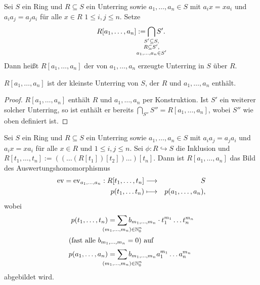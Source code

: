 \documentclass[12pt,a4paper]{scrartcl}
\begin{document}
\begin{defi}
	Sei $S$ ein Ring und $R\subseteq S$ ein Unterring sowie $a_1,\dots,a_n\in S$ mit $a_ix = xa_i$ und $a_ia_j = a_ja_i$ für alle $x\in R$ $1\leq i,j\leq n$. Setze
	\[ R[a_1,\dots,a_n] := \bigcap_{\mathclap{\substack{S'\subseteq S,\\R\subseteq S',\\ a_1,\dots,a_n\in S'}}}S'.\]
	Dann heißt $R[a_1,\dots,a_n]$ der von $a_1,\dots,a_n$ erzeugte Unterring in $S$ über $R$. 
\end{defi}


\begin{bem}
	$R[a_1,\dots,a_n]$ ist der kleinste Unterring von $S$, der $R$ und $a_1,\dots,a_n$ enthält.
\end{bem}
\begin{proof}
	$R[a_1,\dots,a_n]$ enthält $R$ und $a_1,\dots,a_n$ per Konstruktion.
	Ist $S'$ ein weiterer solcher Unterring, so ist enthält er bereits $\bigcap_{S''}S'' = R[a_1,\dots,a_n]$, wobei $S''$ wie oben definiert ist.
\end{proof}

\begin{satz}
	Sei $S$ ein Ring und $R\subseteq S$ ein Unterring sowie $a_1,\dots,a_n\in S$ mit $a_ia_j = a_ja_i$ und $a_ix = xa_i$ für alle $x\in R$ und $1\leq i,j\leq n$. Sei $\phi \colon R\hookrightarrow S$ die Inklusion und $R[t_1,\dots, t_n] := ((\dots(R[t_1])[t_2])\dots)[t_n]$. Dann ist $R[a_1,\dots,a_n]$ das Bild des Auswertungshomomorphismus 
	\begin{eqnarray*}
		\operatorname{ev} = \operatorname{ev}_{a_1,\dots,a_n}: R[t_1,\dots,t_n] & \longrightarrow & S\\
		p(t_1,\dots t_n) & \longmapsto & p(a_1, \dots, a_n),
	\end{eqnarray*}
	wobei
	\begin{align*}
		p (t_1,\dots, t_n) &= \sum_{\mathclap{(m_1,\dots,m_n)\in\IN_{0}^n}}b_{m_1,\dots,m_n}\cdot t_1^{m_1}\dots t_n^{m_n} \\
		\intertext{(fast alle $b_{m_1,\dots,m_n} = 0$) auf}
		p(a_1,\dots, a_n ) &= \sum_{\mathclap{(m_1,\dots, m_n)\in \IN_0^n}} b_{m_1,\dots,m_n}a_1^{m_1}\dots a_n^{m_n}
	\end{align*}
	abgebildet wird.
\end{satz}
\end{document}

